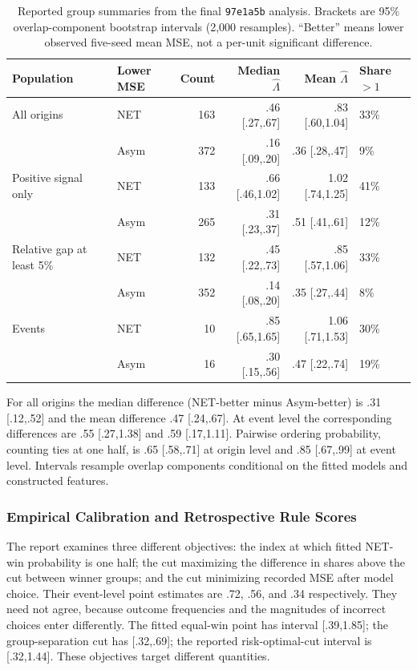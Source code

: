 \begin{table}[htbp]
\centering\small
\caption{Reported group summaries from the final \texttt{97e1a5b} analysis. Brackets are 95\% overlap-component bootstrap intervals (2,000 resamples). ``Better'' means lower observed five-seed mean MSE, not a per-unit significant difference.}
\label{tab:lambdagroups}
\begin{tabular}{@{}llrrrl@{}}\toprule
Population & Lower MSE & Count & Median $\widehat\Lambda$ & Mean $\widehat\Lambda$ & Share $>1$\\\midrule
All origins & NET & 163 & .46 [.27,.67] & .83 [.60,1.04] & 33\%\\
 & Asym & 372 & .16 [.09,.20] & .36 [.28,.47] & 9\%\\
Positive signal only & NET & 133 & .66 [.46,1.02] & 1.02 [.74,1.25] & 41\%\\
 & Asym & 265 & .31 [.23,.37] & .51 [.41,.61] & 12\%\\
Relative gap at least 5\% & NET & 132 & .45 [.22,.73] & .85 [.57,1.06] & 33\%\\
 & Asym & 352 & .14 [.08,.20] & .35 [.27,.44] & 8\%\\
Events & NET & 10 & .85 [.65,1.65] & 1.06 [.71,1.53] & 30\%\\
 & Asym & 16 & .30 [.15,.56] & .47 [.22,.74] & 19\%\\\bottomrule
\end{tabular}
\end{table}

For all origins the median difference (NET-better minus Asym-better) is .31 [.12,.52] and the mean difference .47 [.24,.67]. At event level the corresponding differences are .55 [.27,1.38] and .59 [.17,1.11]. Pairwise ordering probability, counting ties at one half, is .65 [.58,.71] at origin level and .85 [.67,.99] at event level. Intervals resample overlap components conditional on the fitted models and constructed features.

\subsubsection{Empirical Calibration and Retrospective Rule Scores}
\label{app:threshold_calibration}
The report examines three different objectives: the index at which fitted NET-win probability is one half; the cut maximizing the difference in shares above the cut between winner groups; and the cut minimizing recorded MSE after model choice. Their event-level point estimates are .72, .56, and .34 respectively. They need not agree, because outcome frequencies and the magnitudes of incorrect choices enter differently. The fitted equal-win point has interval [.39,1.85]; the group-separation cut has [.32,.69]; the reported risk-optimal-cut interval is [.32,1.44]. These objectives target different quantities.

